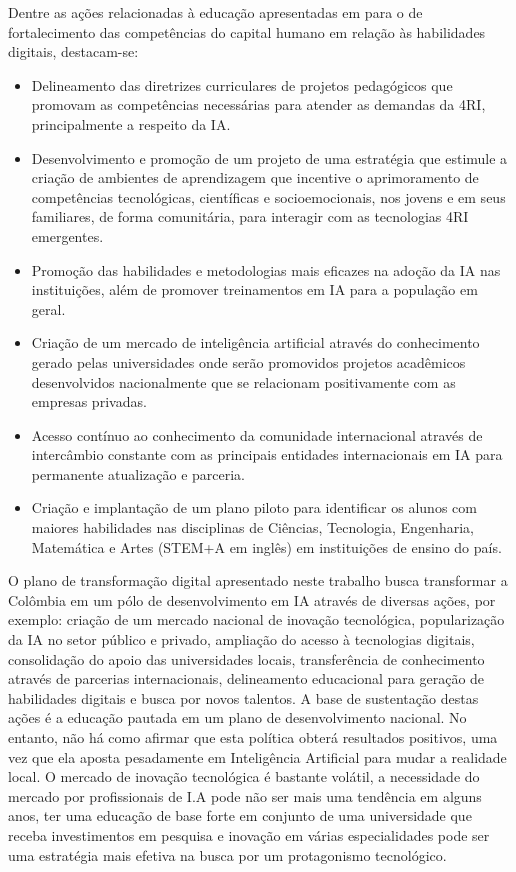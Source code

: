 Dentre as ações relacionadas à educação apresentadas em \cite{de2019politica} para o de fortalecimento das competências do capital humano em relação às habilidades digitais, destacam-se:

\begin{itemize}
    \item Delineamento das diretrizes curriculares de projetos pedagógicos que promovam as competências necessárias para atender as demandas da 4RI, principalmente a respeito da IA.
   \item Desenvolvimento e promoção de um projeto de uma estratégia que estimule a criação de ambientes de aprendizagem que incentive o aprimoramento de competências tecnológicas, científicas e socioemocionais, nos jovens e em seus familiares, de forma comunitária, para interagir com as tecnologias 4RI emergentes.
    \item Promoção das habilidades e metodologias mais eficazes na adoção da IA nas instituições, além de promover treinamentos em IA para a população em geral.
    \item Criação de um mercado de inteligência artificial através do conhecimento gerado pelas universidades onde serão promovidos projetos acadêmicos desenvolvidos nacionalmente que se relacionam positivamente com as empresas privadas.
    \item Acesso contínuo ao conhecim\cite{cerf1993internet}ento da comunidade internacional através de intercâmbio constante com as principais entidades internacionais em IA para permanente atualização e parceria.
   \item Criação e implantação de um plano piloto para identificar os alunos com maiores habilidades nas disciplinas de Ciências, Tecnologia, Engenharia, Matemática e Artes (STEM+A em inglês) em instituições de ensino do país.
\end{itemize}

O plano de transformação digital apresentado neste trabalho busca transformar a Colômbia em um pólo de desenvolvimento em IA através de diversas ações, por exemplo: criação de um mercado nacional de inovação tecnológica, popularização da IA no setor público e privado, ampliação do acesso à tecnologias digitais, consolidação do apoio das universidades locais, transferência de conhecimento através de parcerias internacionais, delineamento educacional para geração de habilidades digitais e busca por novos talentos. A base de sustentação destas ações é a educação pautada em um plano de desenvolvimento nacional. No entanto, não há como afirmar que esta política obterá resultados positivos, uma vez que ela aposta pesadamente em Inteligência Artificial para mudar a realidade local. O mercado de inovação tecnológica é bastante volátil, a necessidade do mercado por profissionais de I.A pode não ser mais uma tendência em alguns anos, ter uma educação de base forte em conjunto de uma universidade que receba investimentos em pesquisa e inovação em várias especialidades pode ser uma estratégia mais efetiva na busca por um protagonismo tecnológico.




